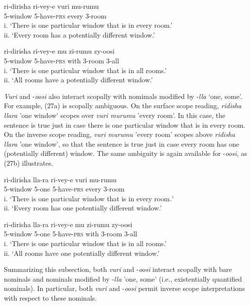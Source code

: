 \documentclass[output=paper]{langsci/langscibook}
\begin{document}
\ea 
\gll ri-dirisha  ri-vey-e  vuri  mu-rumu  \\
     5-window  5-have-\textsc{prs}  every  3-room\\
\glt i. ‘There is one particular window that is in every room.’  \\
ii. ‘Every room has a potentially different window.’  
\z

\ea
\gll ri-dirisha  ri-vey-e  mu  zi-rumu  zy-oosi\\
     5-window  5-have-\textsc{prs}  with  3-room  3-all\\
\glt i. ‘There is one particular window that is in all rooms.’ \\
ii. ‘All rooms have a potentially different window.’        
\z

  \textit{Vuri} and -\textit{oosi} also interact scopally with nomimals modified by -\textit{lla} ‘one, some’. For example, (27a) is scopally ambiguous. On the surface scope reading, \textit{ridisha llara} 'one window' scopes over \textit{vuri murumu} 'every room'. In this case, the sentence is true just in case there is one particular window that is in every room. On the inverse scope reading, \textit{vuri murumu} 'every room' scopes above \textit{ridisha llara} 'one window', so that the sentence is true just in case every room has one (potentially different) window. The same ambiguity is again available for -\textit{oosi}, as (27b) illustrates.

\ea 
\gll ri-dirisha     lla-ra  ri-vey-e  vuri  mu-rumu  \\
     5-window   5-one  5-have-\textsc{prs}  every  3-room\\
\glt i. ‘There is one particular window that is in every room\textit{.}’\textit{}  \\
ii. ‘Every room has one potentially different window.’       \textit{} 
\z

\ea
\gll ri-dirisha   lla-ra   ri-vey-e         mu     zi-rumu  zy-oosi\\
     5-window  5-one   5-have-\textsc{prs}    with   3-room  3-all\\
\glt i. ‘There is one particular window that is in all rooms.’\textit{} \\
ii. ‘All rooms have one potentially different window.’    \textsc{}  
\z

  Summarizing this subsection, both \textit{vuri} and -\textit{oosi} interact scopally with bare nominals and nominals modified by -\textit{lla} 'one, some' (i.e., existentially quantified nominals). In particular, both \textit{vuri} and -\textit{oosi} permit inverse scope interpretations with respect to these nominals.
\end{document}

